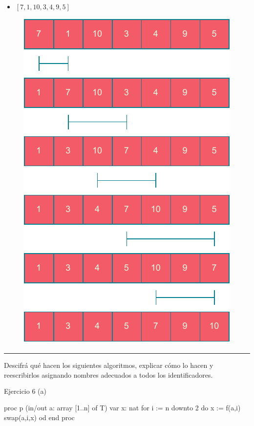 \begin{itemize}
    \item[(a)] $[7, 1, 10, 3, 4, 9, 5]$
\end{itemize}

\begin{figure}[h]
    \centering
    \includegraphics[scale=0.8]{estáticos/4a.pdf}
\end{figure}

\begin{center}
    \rule{\textwidth}{0.4pt}
\end{center}

Descifrá qué hacen los siguientes algoritmos, explicar cómo lo hacen y reescribirlos asignando nombres adecuados a todos los identificadores.

\begin{codebox}{Ejercicio 6 (a)}
\begin{pascallike}
proc p (in/out a: array [1..n] of T)
    var x: nat
    for i := n downto 2 do
    x := f(a,i)
    swap(a,i,x)
    od
end proc
\end{pascallike}
\end{codebox}

